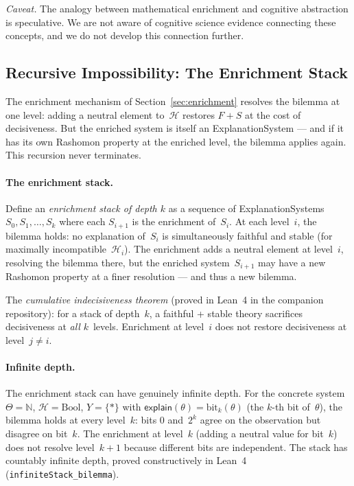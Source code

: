 \documentclass[11pt,a4paper]{article}
\newcommand{\sH}{\mathcal{H}}
\begin{document}
\smallskip\noindent\emph{Caveat.} The analogy between mathematical enrichment and cognitive abstraction is speculative. We are not aware of cognitive science evidence connecting these concepts, and we do not develop this connection further.

\subsection{Recursive Impossibility: The Enrichment Stack}
\label{sec:recursive}

The enrichment mechanism of Section~\ref{sec:enrichment} resolves the bilemma at one level: adding a neutral element to~$\sH$ restores $F+S$ at the cost of decisiveness. But the enriched system is itself an ExplanationSystem --- and if it has its own Rashomon property at the enriched level, the bilemma applies again. This recursion never terminates.

\paragraph{The enrichment stack.}
Define an \emph{enrichment stack of depth $k$} as a sequence of ExplanationSystems $S_0, S_1, \ldots, S_k$ where each $S_{i+1}$ is the enrichment of~$S_i$. At each level~$i$, the bilemma holds: no explanation of~$S_i$ is simultaneously faithful and stable (for maximally incompatible~$\sH_i$). The enrichment adds a neutral element at level~$i$, resolving the bilemma there, but the enriched system~$S_{i+1}$ may have a new Rashomon property at a finer resolution --- and thus a new bilemma.

The \emph{cumulative indecisiveness theorem} (proved in Lean~4 in the companion repository): for a stack of depth~$k$, a faithful + stable theory sacrifices decisiveness at \emph{all} $k$~levels. Enrichment at level~$i$ does not restore decisiveness at level~$j \neq i$.

\paragraph{Infinite depth.}
The enrichment stack can have genuinely infinite depth. For the concrete system $\Theta = \mathbb{N}$, $\sH = \text{Bool}$, $Y = \{*\}$ with $\mathsf{explain}(\theta) = \text{bit}_k(\theta)$ (the $k$-th bit of~$\theta$), the bilemma holds at every level~$k$: bits 0 and~$2^k$ agree on the observation but disagree on bit~$k$. The enrichment at level~$k$ (adding a neutral value for bit~$k$) does not resolve level~$k+1$ because different bits are independent. The stack has countably infinite depth, proved constructively in Lean~4 (\texttt{infiniteStack\_bilemma}).
\end{document}
